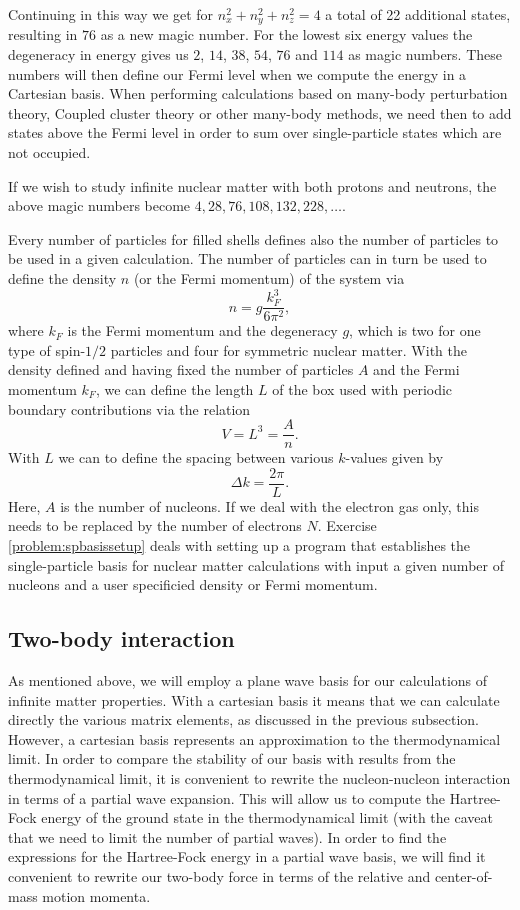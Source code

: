 Continuing in this way we get for $n_{x}^{2}+n_{y}^{2}+n_{z}^{2}=4$ a
total of 22 additional states, resulting in $76$ as a new magic
number. For the lowest six energy values the degeneracy in energy
gives us $2$, $14$, $38$, $54$, $76$ and $114$ as magic numbers. These
numbers will then define our Fermi level when we compute the energy in
a Cartesian basis. When performing calculations based on many-body
perturbation theory, Coupled cluster theory or other many-body
methods, we need then to add states above the Fermi level in order to
sum over single-particle states which are not occupied.

If we wish to study infinite nuclear matter with both protons and
neutrons, the above magic numbers become $4, 28, 76, 108, 132, 228,
\dots$.

Every number of particles for filled shells defines also the number of
particles to be used in a given calculation. The number of particles
can in turn be used to define the density $n$ (or the Fermi momentum)
of the system via
\[
n = g \frac{k_F^3}{6\pi^2},
\]
where $k_F$ is the Fermi momentum and the degeneracy $g$, which is two
for one type of spin-$1/2$ particles and four for symmetric nuclear
matter.  With the density defined and having fixed the number of
particles $A$ and the Fermi momentum $k_F$, we can define the length
$L$ of the box used with periodic boundary contributions via the
relation
\[
  V= L^3= \frac{A}{n}.
\]
With $L$ we can to define the spacing between various
$k$-values given by
\[
  \Delta k = \frac{2\pi}{L}.
\]
Here, $A$ is the number of nucleons. If we deal with the electron
gas only, this needs to be replaced by the number of electrons $N$.
Exercise \ref{problem:spbasissetup} deals with setting up a program
that establishes the single-particle basis for nuclear matter
calculations with input a given number of nucleons and a user
specificied density or Fermi momentum.


\subsection{Two-body interaction}

As mentioned above, we will employ a plane wave basis for our
calculations of infinite matter properties. With a cartesian basis it
means that we can calculate directly the various matrix elements, as
discussed in the previous subsection. However, a cartesian basis
represents an approximation to the thermodynamical limit. In order to
compare the stability of our basis with results from the
thermodynamical limit, it is convenient to rewrite the nucleon-nucleon
interaction in terms of a partial wave expansion. This will allow us
to compute the Hartree-Fock energy of the ground state in the
thermodynamical limit (with the caveat that we need to limit the
number of partial waves). In order to find the expressions for the
Hartree-Fock energy in a partial wave basis, we will find it
convenient to rewrite our two-body force in terms of the relative and
center-of-mass motion momenta.

